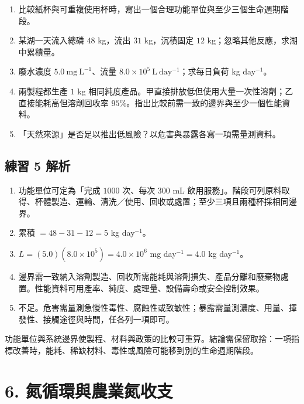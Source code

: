 \documentclass[11pt,a4paper]{article}
\providecommand{\tightlist}{%
  \setlength{\itemsep}{0pt}\setlength{\parskip}{0pt}}
\begin{document}
\begin{enumerate}
\def\labelenumi{\arabic{enumi}.}
\tightlist
\item
  比較紙杯與可重複使用杯時，寫出一個合理功能單位與至少三個生命週期階段。
\item
  某湖一天流入總磷 \(48\) kg，流出 \(31\) kg，沉積固定 \(12\) kg；忽略其他反應，求湖中累積量。
\item
  廢水濃度 \(5.0\ \mathrm{mg\ L^{-1}}\)、流量 \(8.0\times10^5\ \mathrm{L\ day^{-1}}\)；求每日負荷 kg day\(^{-1}\)。
\item
  兩製程都生產 \(1\) kg 相同純度產品。甲直接排放低但使用大量一次性溶劑；乙直接能耗高但溶劑回收率 \(95\%\)。指出比較前需一致的邊界與至少一個性能資料。
\item
  「天然來源」是否足以推出低風險？以危害與暴露各寫一項需量測資料。
\end{enumerate}

\subsection{練習 5 解析}\label{ux7df4ux7fd2-5-ux89e3ux6790}

\begin{enumerate}
\def\labelenumi{\arabic{enumi}.}
\tightlist
\item
  功能單位可定為「完成 \(1000\) 次、每次 \(300\) mL 飲用服務」。階段可列原料取得、杯體製造、運輸、清洗／使用、回收或處置；至少三項且兩種杯採相同邊界。
\item
  累積 \(=48-31-12=5\) kg day\(^{-1}\)。
\item
  \(L=(5.0)(8.0\times10^5)=4.0\times10^6\) mg day\(^{-1}=4.0\) kg day\(^{-1}\)。
\item
  邊界需一致納入溶劑製造、回收所需能耗與溶劑損失、產品分離和廢棄物處置。性能資料可用產率、純度、處理量、設備壽命或安全控制效果。
\item
  不足。危害需量測急慢性毒性、腐蝕性或致敏性；暴露需量測濃度、用量、揮發性、接觸途徑與時間，任各列一項即可。
\end{enumerate}

功能單位與系統邊界使製程、材料與政策的比較可重算。結論需保留取捨：一項指標改善時，能耗、稀缺材料、毒性或風險可能移到別的生命週期階段。

\section{6. 氮循環與農業氮收支}\label{ux6c2eux5faaux74b0ux8207ux8fb2ux696dux6c2eux6536ux652f}
\end{document}
